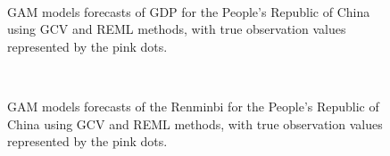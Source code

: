 \documentclass[11pt,regno]{amsart}
\theoremstyle{plain}
\numberwithin{equation}{section}
\begin{document}
\begin{figure}
\centering
\centerline{ \mbox{
  \quad
{}
}}
\caption{GAM models forecasts of GDP for the People's Republic of China using GCV and REML methods, with true observation values represented by the pink dots.}
\end{figure}

\begin{figure}
\centering
\centerline{ \mbox{
  \quad
{}
}}
\caption{GAM models forecasts of the Renminbi for the People's Republic of China using GCV and REML methods, with true observation values represented by the pink dots.}
\end{figure}
\end{document}
